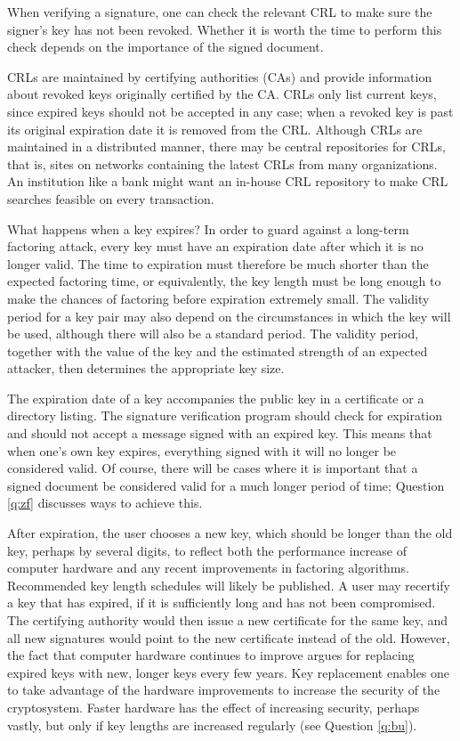 When verifying a signature, one can check the relevant CRL to make sure
the signer's key has not been revoked. Whether it is worth the time to 
perform this check depends on the importance of the signed document. 

CRLs are maintained by certifying authorities (CAs) and provide information 
about revoked keys originally certified by the CA. CRLs only list current 
keys, since expired keys should not be accepted in any case; when a revoked 
key is past its original expiration date it is removed from the CRL. Although 
CRLs are maintained in a distributed manner, there may be central 
repositories for CRLs, that is, sites on networks containing the latest CRLs 
from many organizations. An institution like a bank might want an in-house 
CRL repository to make CRL searches feasible on every transaction.

{What happens when a key expires?}
In order to guard against a long-term factoring attack, every key must 
have an expiration date after which it is no longer valid. The time to 
expiration must therefore be much shorter than the expected factoring time, 
or equivalently, the key length must be long enough to make the chances of 
factoring before expiration extremely small. The validity period for a key 
pair may also depend on the circumstances in which the key will be used, 
although there will also be a standard period. The validity period, together
with the value of the key and the estimated strength of an expected attacker, 
then determines the appropriate key size.

The expiration date of a key accompanies the public key in a certificate
or a directory listing. The signature verification program should check 
for expiration and should not accept a message signed with an expired key. 
This means that when one's own key expires, everything signed with it will
no longer be considered valid. Of course, there will be cases where it is 
important that a signed document be considered valid for a much longer period 
of time; Question \ref{q:zf} discusses ways to achieve this.

After expiration, the user chooses a new key, which should be longer than 
the old key, perhaps by several digits, to reflect both the performance 
increase of computer hardware and any recent improvements in factoring 
algorithms. Recommended key length schedules will likely be published. A user 
may recertify a key that has expired, if it is sufficiently long and has not 
been compromised. The certifying authority would then issue a new certificate 
for the same key, and all new signatures would point to the new certificate 
instead of the old. However, the fact that computer hardware continues to 
improve argues for replacing expired keys with new, longer keys every few 
years. Key replacement enables one to take advantage of the hardware 
improvements to increase the security of the cryptosystem. Faster hardware 
has the effect of increasing security, perhaps vastly, but only if key 
lengths are increased regularly (see Question \ref{q:bu}).

